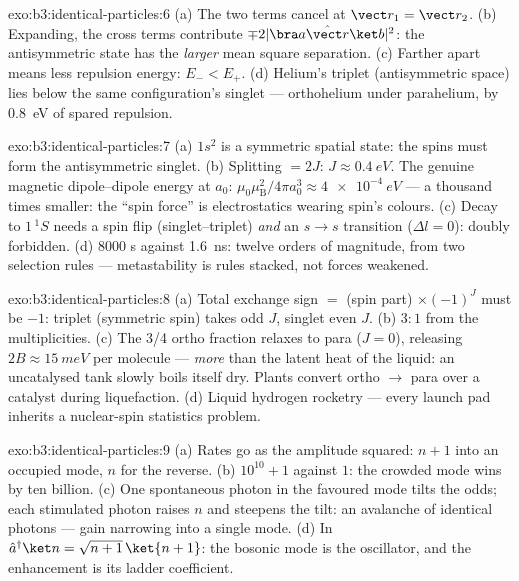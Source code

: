 \begin{solution}{exo:b3:identical-particles:6}
(a) The two terms cancel at $\vect r_1 = \vect r_2$. (b) Expanding,
the cross terms contribute $\mp2|\bra a\hat{\vect r}\ket b|^2$:
the antisymmetric state has the \emph{larger} mean square
separation. (c) Farther apart means less repulsion energy: $E_- <
E_+$. (d) Helium's triplet (antisymmetric space) lies below the
same configuration's singlet --- orthohelium under parahelium, by
\qty{0.8}{eV} of spared repulsion.
\end{solution}

\begin{solution}{exo:b3:identical-particles:7}
(a) $1s^2$ is a symmetric spatial state: the spins must form the
antisymmetric singlet. (b) Splitting $= 2J$: $J \approx
\qty{0.4}{eV}$. The genuine magnetic dipole--dipole energy at
$a_0$: $\mu_0\mu_{\text{B}}^2/4\pi a_0^3 \approx \qty{4e-4}{eV}$
--- a thousand times smaller: the ``spin force'' is electrostatics
wearing spin's colours. (c) Decay to $1\,^1S$ needs a spin flip
(singlet--triplet) \emph{and} an $s \to s$ transition ($\Delta l =
0$): doubly forbidden. (d) $8000$ s against \qty{1.6}{ns}: twelve
orders of magnitude, from two selection rules --- metastability is
rules stacked, not forces weakened.
\end{solution}

\begin{solution}{exo:b3:identical-particles:8}
(a) Total exchange sign $=$ (spin part) $\times (-1)^J$ must be
$-1$: triplet (symmetric spin) takes odd $J$, singlet even $J$.
(b) $3:1$ from the multiplicities. (c) The 3/4 ortho fraction
relaxes to para ($J = 0$), releasing $2B \approx \qty{15}{meV}$
per molecule --- \emph{more} than the latent heat of the liquid:
an uncatalysed tank slowly boils itself dry. Plants convert
ortho $\to$ para over a catalyst during liquefaction. (d) Liquid
hydrogen rocketry --- every launch pad inherits a nuclear-spin
statistics problem.
\end{solution}

\begin{solution}{exo:b3:identical-particles:9}
(a) Rates go as the amplitude squared: $n + 1$ into an occupied
mode, $n$ for the reverse. (b) $10^{10} + 1$ against $1$: the
crowded mode wins by ten billion. (c) One spontaneous photon in
the favoured mode tilts the odds; each stimulated photon raises
$n$ and steepens the tilt: an avalanche of identical photons ---
gain narrowing into a single mode. (d) In $\hat a^\dagger\ket n =
\sqrt{n+1}\,\ket{n+1}$: the bosonic mode is the oscillator, and
the enhancement is its ladder coefficient.
\end{solution}

